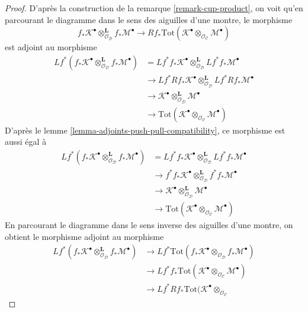 \begin{proof}
D'après la construction de la remarque \ref{remark-cup-product}, on voit qu'en
parcourant le diagramme dans le sens des aiguilles d'une montre, le morphisme
$$
f_*\mathcal{K}^\bullet
\otimes_{\mathcal{O}_\mathcal{D}}^\mathbf{L}
f_*\mathcal{M}^\bullet 
\longrightarrow
Rf_*\text{Tot}(\mathcal{K}^\bullet
\otimes_{\mathcal{O}_\mathcal{C}}
\mathcal{M}^\bullet)
$$
est adjoint au morphisme
\begin{align*}
Lf^*(f_*\mathcal{K}^\bullet
\otimes_{\mathcal{O}_\mathcal{D}}^\mathbf{L}
f_*\mathcal{M}^\bullet)
& =
Lf^*f_*\mathcal{K}^\bullet
\otimes_{\mathcal{O}_\mathcal{D}}^\mathbf{L}
Lf^*f_*\mathcal{M}^\bullet \\
& \to
Lf^*Rf_*\mathcal{K}^\bullet
\otimes_{\mathcal{O}_\mathcal{D}}^\mathbf{L}
Lf^*Rf_*\mathcal{M}^\bullet \\
& \to
\mathcal{K}^\bullet
\otimes_{\mathcal{O}_\mathcal{D}}^\mathbf{L}
\mathcal{M}^\bullet \\
& \to
\text{Tot}(\mathcal{K}^\bullet
\otimes_{\mathcal{O}_\mathcal{C}}
\mathcal{M}^\bullet)
\end{align*}
D'après le lemme \ref{lemma-adjoints-push-pull-compatibility}, ce morphisme est aussi égal à
\begin{align*}
Lf^*(f_*\mathcal{K}^\bullet
\otimes_{\mathcal{O}_\mathcal{D}}^\mathbf{L}
f_*\mathcal{M}^\bullet)
& =
Lf^*f_*\mathcal{K}^\bullet
\otimes_{\mathcal{O}_\mathcal{D}}^\mathbf{L}
Lf^*f_*\mathcal{M}^\bullet \\
& \to
f^*f_*\mathcal{K}^\bullet
\otimes_{\mathcal{O}_\mathcal{D}}^\mathbf{L}
f^*f_*\mathcal{M}^\bullet \\
& \to
\mathcal{K}^\bullet
\otimes_{\mathcal{O}_\mathcal{D}}^\mathbf{L}
\mathcal{M}^\bullet \\
& \to
\text{Tot}(\mathcal{K}^\bullet
\otimes_{\mathcal{O}_\mathcal{C}}
\mathcal{M}^\bullet)
\end{align*}
En parcourant le diagramme dans le sens inverse des aiguilles d'une montre,
on obtient le morphisme adjoint au morphisme
\begin{align*}
Lf^*(f_*\mathcal{K}^\bullet
\otimes_{\mathcal{O}_\mathcal{D}}^\mathbf{L}
f_*\mathcal{M}^\bullet)
& \to
Lf^*\text{Tot}(
f_*\mathcal{K}^\bullet
\otimes_{\mathcal{O}_\mathcal{D}}
f_*\mathcal{M}^\bullet) \\
& \to
Lf^*f_*\text{Tot}(\mathcal{K}^\bullet
\otimes_{\mathcal{O}_\mathcal{C}}
\mathcal{M}^\bullet) \\
& \to
Lf^*Rf_*\text{Tot}(\mathcal{K}^\bullet
\otimes_{\mathcal{O}_\mathcal{C}}

\end{align*}
\end{proof}
